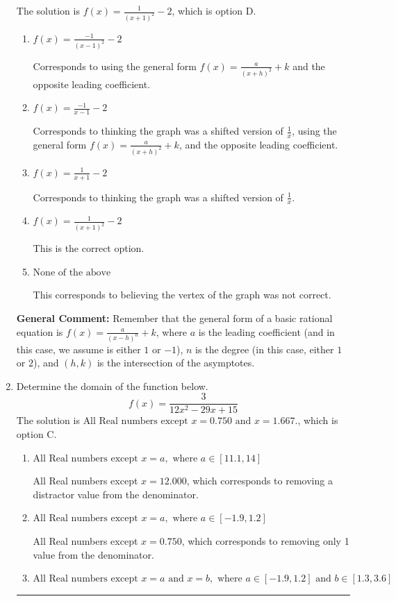 \documentclass{extbook}[14pt]
\newcommand{\litem}[1]{\item #1

\rule{\textwidth}{0.4pt}}
\begin{document}
\begin{enumerate}
{The solution is \( f(x) = \frac{1}{(x + 1)^2} - 2 \), which is option D.\begin{enumerate}[label=\Alph*.]
\item \( f(x) = \frac{-1}{(x - 1)^2} - 2 \)

Corresponds to using the general form $f(x) = \frac{a}{(x+h)^2}+k$ and the opposite leading coefficient.
\item \( f(x) = \frac{-1}{x - 1} - 2 \)

Corresponds to thinking the graph was a shifted version of $\frac{1}{x}$, using the general form $f(x) = \frac{a}{(x+h)^2}+k$, and the opposite leading coefficient.
\item \( f(x) = \frac{1}{x + 1} - 2 \)

Corresponds to thinking the graph was a shifted version of $\frac{1}{x}$.
\item \( f(x) = \frac{1}{(x + 1)^2} - 2 \)

This is the correct option.
\item \( \text{None of the above} \)

This corresponds to believing the vertex of the graph was not correct.
\end{enumerate}

\textbf{General Comment:} Remember that the general form of a basic rational equation is $ f(x) = \frac{a}{(x-h)^n} + k$, where $a$ is the leading coefficient (and in this case, we assume is either $1$ or $-1$), $n$ is the degree (in this case, either $1$ or $2$), and $(h, k)$ is the intersection of the asymptotes.
}
\litem{
Determine the domain of the function below.
\[ f(x) = \frac{3}{12x^{2} -29 x + 15} \]The solution is \( \text{All Real numbers except } x = 0.750 \text{ and } x = 1.667. \), which is option C.\begin{enumerate}[label=\Alph*.]
\item \( \text{All Real numbers except } x = a, \text{ where } a \in [11.1, 14] \)

All Real numbers except $x = 12.000$, which corresponds to removing a distractor value from the denominator.
\item \( \text{All Real numbers except } x = a, \text{ where } a \in [-1.9, 1.2] \)

All Real numbers except $x = 0.750$, which corresponds to removing only 1 value from the denominator.
\item \( \text{All Real numbers except } x = a \text{ and } x = b, \text{ where } a \in [-1.9, 1.2] \text{ and } b \in [1.3, 3.6] \)


\end{enumerate}}
\end{enumerate}
\end{document}
